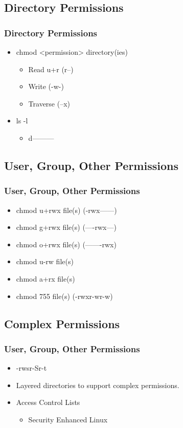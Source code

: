 \documentclass[hyperref={pdfpagelabels=false}]{beamer}
\begin{document}
\subsection{Directory Permissions}
\frame
{
    \frametitle{Directory Permissions}
    \begin{itemize}
    \item{chmod <permission> directory(ies)}
        \begin{itemize}
        \item{Read u+r (r--)}
        \item{Write (-w-)}
        \item{Traverse (--x)}
        \end{itemize}
    \item{ls -l}
        \begin{itemize}
        \item{d---------}
        \end{itemize}
    \end{itemize}
}
\subsection{User, Group, Other Permissions}
\frame
{
    \frametitle{User, Group, Other Permissions}
    \begin{itemize}
    \item{chmod u+rwx file(s) (-rwx------)}
    \item{chmod g+rwx file(s) (----rwx---)}
    \item{chmod o+rwx file(s) (-------rwx)}
    \end{itemize}
    \begin{itemize}
    \item{chmod u-rw file(s)}
    \item{chmod a+rx file(s)}
    \item{chmod 755 file(s) (-rwxr-wr-w)}
    \end{itemize}
}
\subsection{Complex Permissions}
\frame
{
    \frametitle{User, Group, Other Permissions}
    \begin{itemize}
    \item{-rwsr-Sr-t}
    \item{Layered directories to support complex permissions.}
    \item{Access Control Lists}
        \begin{itemize}
        \item{Security Enhanced Linux}
        \end{itemize}
    \end{itemize}
}
\end{document}
